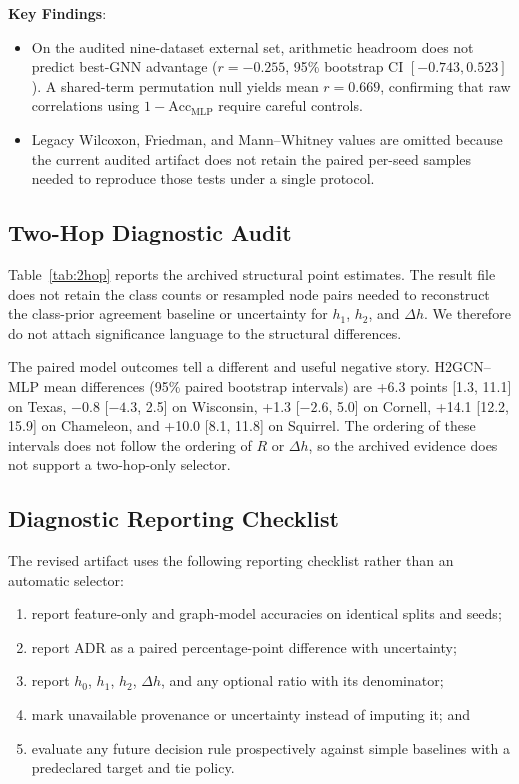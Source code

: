 \textbf{Key Findings}:
\begin{itemize}
    \item On the audited nine-dataset external set, arithmetic headroom does not predict best-GNN advantage ($r=-0.255$, 95\% bootstrap CI $[-0.743,0.523]$). A shared-term permutation null yields mean $r=0.669$, confirming that raw correlations using $1-\text{Acc}_{\text{MLP}}$ require careful controls.
    \item Legacy Wilcoxon, Friedman, and Mann--Whitney values are omitted because the current audited artifact does not retain the paired per-seed samples needed to reproduce those tests under a single protocol.
\end{itemize}

\subsection{Two-Hop Diagnostic Audit}

Table~\ref{tab:2hop} reports the archived structural point estimates. The result file does not retain the class counts or resampled node pairs needed to reconstruct the class-prior agreement baseline or uncertainty for $h_1$, $h_2$, and $\Delta h$. We therefore do not attach significance language to the structural differences.

The paired model outcomes tell a different and useful negative story. H2GCN--MLP mean differences (95\% paired bootstrap intervals) are +6.3 points [1.3, 11.1] on Texas, $-0.8$ [$-4.3$, 2.5] on Wisconsin, +1.3 [$-2.6$, 5.0] on Cornell, +14.1 [12.2, 15.9] on Chameleon, and +10.0 [8.1, 11.8] on Squirrel. The ordering of these intervals does not follow the ordering of $R$ or $\Delta h$, so the archived evidence does not support a two-hop-only selector.

\subsection{Diagnostic Reporting Checklist}

The revised artifact uses the following reporting checklist rather than an automatic selector:
\begin{enumerate}
    \item report feature-only and graph-model accuracies on identical splits and seeds;
    \item report ADR as a paired percentage-point difference with uncertainty;
    \item report $h_0$, $h_1$, $h_2$, $\Delta h$, and any optional ratio with its denominator;
    \item mark unavailable provenance or uncertainty instead of imputing it; and
    \item evaluate any future decision rule prospectively against simple baselines with a predeclared target and tie policy.
\end{enumerate}
